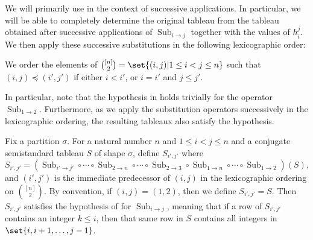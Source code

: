 \documentclass[10pt,a4paper]{amsart}
\DeclareMathOperator{\Sub}{Sub}
\begin{document}
We will primarily use  in the context of successive applications.
In particular, we will be able to completely determine the original tableau from the tableau obtained after successive applications of $\Sub_{i \to j}$ together with the values of $h_i^j$.
We then apply these successive substitutions in the following lexicographic order:
\begin{defn}\label{defn:ordering}
    We order the elements of $\binom{[n]}{2}=\set{(i, j) | 1 \leq i < j \leq n}$ such that $(i,j) \preceq (i',j')$ if either $i < i'$, or $i = i'$ and $j \leq j'$.
\end{defn}
In particular, note that the hypothesis in  holds trivially for the operator $\Sub_{1 \to 2}$.
Furthermore, as we apply the substitution operators successively in the lexicographic ordering, the resulting tableaux also satisfy the hypothesis.

\begin{lem}\label{lem:sub_successive_hyp}
    Fix a partition $\sigma$.
    For a natural number $n$ and $1 \leq i < j \leq n$ and a conjugate semistandard tableau $S$ of shape $\sigma$, define $S_{i', j'}$ where
    \[
        S_{i', j'} = (\Sub_{i' \to j'} \circ \cdots \circ \Sub_{2 \to n}\circ\cdots\circ\Sub_{2 \to 3} \circ \Sub_{1 \to n} \circ \cdots \circ \Sub_{1 \to 2})(S),
    \]
    and $(i', j')$ is the immediate predecessor of $(i, j)$ in the lexicographic ordering on $\binom{[n]}{2}$.
    By convention, if $(i, j) = (1, 2)$, then we  define $S_{i', j'} = S$.
    Then $S_{i', j'}$ satisfies the hypothesis of  for $\Sub_{i \to j}$, meaning that if a row of $S_{i', j'}$ contains an integer $k \leq i$, then that same row in $S$ contains all integers in $\set{i, i + 1, \ldots, j - 1}$.
\end{lem}
\end{document}
